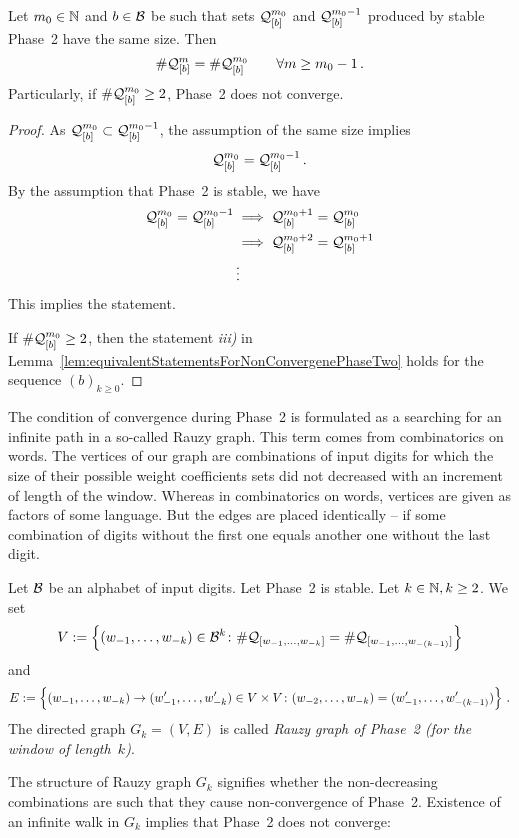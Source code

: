 \begin{thm}
\label{thm:bbbCondition}
Let $m_0 \in \NN$ and $b\in\B$ be such that sets $\Qb{m_0}$ and $\Qb{m_0-1}$ produced by stable Phase~2 have the same size. Then
$$
    \#\Qb{m} = \#\Qb{m_0} \qquad \forall m\geq m_0-1\,.
$$ 
Particularly, if $\#\Qb{m_0}\geq 2$, Phase~2 does not converge.
\end{thm}
\begin{proof}
As $\Qb{m_0} \subset \Qb{m_0-1}$, the assumption of the same size implies
$$
    \Qb{m_0} = \Qb{m_0-1}\,.
$$
By the assumption that Phase~2 is stable, we have
\begin{align*}
 \Qb{m_0} = \Qb{m_0-1} &\implies  \Qb{m_0+1} = \Qb{m_0} \\
 						&\implies  \Qb{m_0+2} = \Qb{m_0+1} \\
 						&\vdots
\end{align*}
This implies the statement.

If $\#\Qb{m_0}\geq 2$, then the statement \textit{iii)} in Lemma~\ref{lem:equivalentStatementsForNonConvergenePhaseTwo} holds for the sequence $(b)_{k\geq 0}$.
\end{proof}



The condition of convergence during Phase~2 is formulated as a searching for an infinite path in a so-called Rauzy graph. This term comes from combinatorics on words. The vertices of our graph are combinations of input digits for which the size of their possible weight coefficients sets did not decreased with an increment of length of the window. Whereas in combinatorics on words, vertices are given as factors of some language. But the edges are placed identically -- if some combination of digits without the first one equals another one without the last digit.
\begin{defn}
Let $\B$ be an alphabet of input digits. Let Phase~2 is stable. Let $k\in\NN, k\geq 2$. We set
$$
V:=\left\{\tuple{1}{k}\in\B^k \colon \#\Qw{1}{k}=\#\Qw{1}{(k-1)}\right\}
$$
and
$$
E:=\left\{\tuple{1}{k}\rightarrow\tuple[w']{1}{k}\in V\times V \colon \tuple{2}{k}=\tuple[w']{1}{(k-1)}\right\}\,.
$$
The directed graph $G_k=(V,E)$ is called \emph{Rauzy graph of Phase~2 (for the window of length~$k$)}.
\end{defn}

The structure of Rauzy graph $G_k$ signifies whether the non-decreasing combinations are such that they cause non-convergence of Phase~2. Existence of an infinite walk in $G_k$ implies that Phase~2 does not converge:


